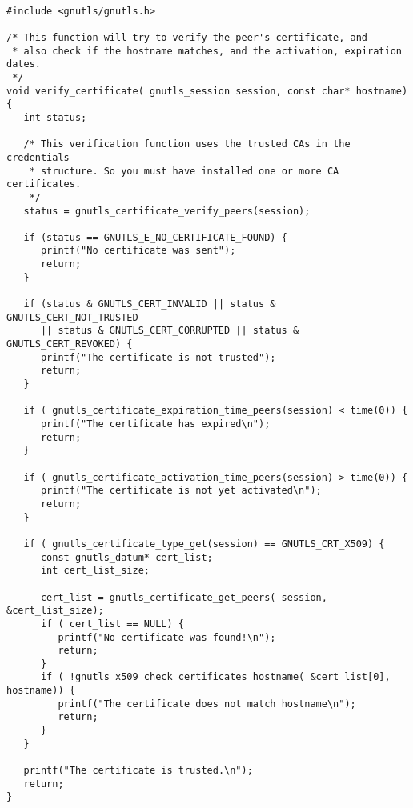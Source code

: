 \label{ex:rfc2818}

\begin{verbatim}

#include <gnutls/gnutls.h>

/* This function will try to verify the peer's certificate, and
 * also check if the hostname matches, and the activation, expiration dates.
 */
void verify_certificate( gnutls_session session, const char* hostname)
{
   int status;

   /* This verification function uses the trusted CAs in the credentials
    * structure. So you must have installed one or more CA certificates.
    */
   status = gnutls_certificate_verify_peers(session);

   if (status == GNUTLS_E_NO_CERTIFICATE_FOUND) {
      printf("No certificate was sent");
      return;
   }

   if (status & GNUTLS_CERT_INVALID || status & GNUTLS_CERT_NOT_TRUSTED
      || status & GNUTLS_CERT_CORRUPTED || status & GNUTLS_CERT_REVOKED) {
      printf("The certificate is not trusted");
      return;
   }

   if ( gnutls_certificate_expiration_time_peers(session) < time(0)) {
      printf("The certificate has expired\n");
      return;
   }

   if ( gnutls_certificate_activation_time_peers(session) > time(0)) {
      printf("The certificate is not yet activated\n");
      return;
   }

   if ( gnutls_certificate_type_get(session) == GNUTLS_CRT_X509) {
      const gnutls_datum* cert_list;
      int cert_list_size;
      
      cert_list = gnutls_certificate_get_peers( session, &cert_list_size);
      if ( cert_list == NULL) {
         printf("No certificate was found!\n");
         return;
      }
      if ( !gnutls_x509_check_certificates_hostname( &cert_list[0], hostname)) {
         printf("The certificate does not match hostname\n");
         return;
      }
   }
   
   printf("The certificate is trusted.\n");
   return;
}

\end{verbatim}
